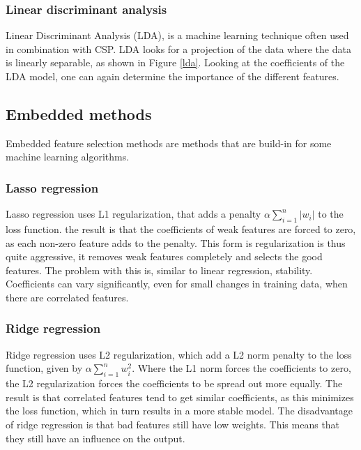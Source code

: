 \subsubsection{Linear discriminant analysis}
Linear Discriminant Analysis (LDA), is a machine learning technique often used in combination with CSP\cite{ErrorPotentials,svmldacomp,currTrends}. LDA looks for a projection of the data where the data is linearly separable, as shown in Figure \ref{lda}. Looking at the coefficients of the LDA model, one can again determine the importance of the different features.


\subsection{Embedded methods}
Embedded feature selection methods are methods that are build-in for some machine learning algorithms.

\subsubsection{Lasso regression}
\label{lassoregression}
Lasso regression uses L1 regularization, that adds a penalty $\alpha\sum\limits_{i=1}^{n} |w_i|$ to the loss function. the result is that the coefficients of weak features are forced to zero, as each non-zero feature adds to the penalty. This form is regularization is thus quite aggressive, it removes weak features completely and selects the good features. The problem with this is, similar to linear regression, stability. Coefficients can vary significantly, even for small changes in training data, when there are correlated features.

\subsubsection{Ridge regression}
Ridge regression uses L2 regularization, which add a L2 norm penalty to the loss function, given by $\alpha\sum\limits_{i=1}^{n} w_i^2$. Where the L1 norm forces the coefficients to zero, the L2 regularization forces the coefficients to be spread out more equally. The result is that correlated features tend to get similar coefficients, as this minimizes the loss function, which in turn results in a more stable model. The disadvantage of ridge regression is that bad features still have low weights. This means that they still have an influence on the output.

